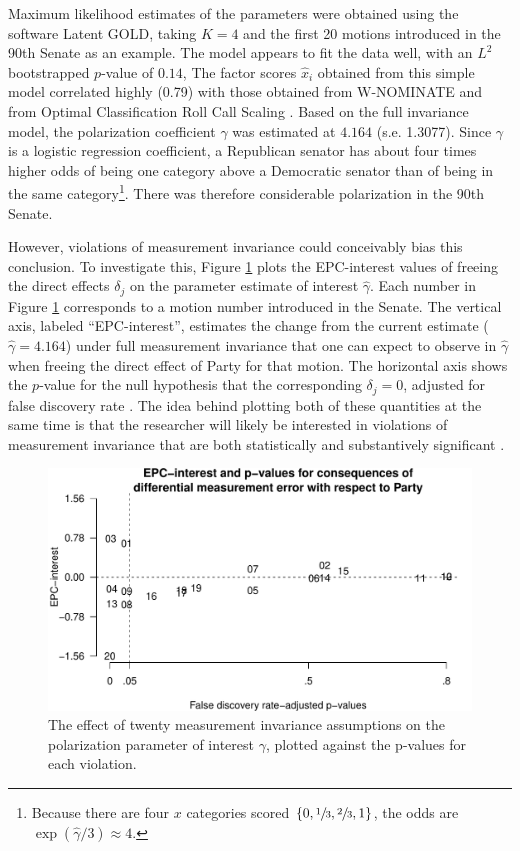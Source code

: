 \documentclass[letterpaper,12pt]{article}
\begin{document}
Maximum likelihood estimates of the parameters were obtained using the software Latent GOLD, taking $K=4$ and the first 20 motions introduced in the 90th Senate as an example. The model appears to fit the data well, with an $L^2$ bootstrapped $p$-value of $0.14$, The factor scores $\hat{x}_i$ obtained from this simple model correlated highly (0.79) with those obtained from W-NOMINATE \citep{poole2008scaling} and from Optimal Classification Roll Call Scaling \citep[0.81;][]{poole2012oc}. Based on the full invariance model, the polarization coefficient $\hat{\gamma}$ was estimated at $4.164$ (s.e. 1.3077). Since $\gamma$ is a logistic regression coefficient,  a Republican senator has about four times higher odds of being one category above a Democratic senator than of being in the same category\footnote{Because there are four $x$ categories scored $\{0, \sfrac{1}{3}, \sfrac{2}{3}, 1\}$, the odds are $\exp(\hat{\gamma}/3)\approx4$.}. There was therefore considerable polarization in the 90th Senate. 

However, violations of measurement invariance could conceivably bias this conclusion. To investigate this, Figure \ref{fig:epc-interest} plots the EPC-interest values of freeing the direct effects $\delta_j$ on the parameter estimate of interest $\hat{\gamma}$. Each number in Figure \ref{fig:epc-interest} corresponds to a motion number introduced in the Senate. The vertical axis, labeled ``EPC-interest'', estimates the change from the current estimate ($\hat{\gamma}=4.164$) under full measurement invariance that one can expect to observe in $\hat{\gamma}$ when freeing the direct effect of Party for that motion. 
The horizontal axis shows the $p$-value for the null hypothesis that the corresponding $\delta_j = 0$, adjusted for false discovery rate \citep{benjamini1995controlling}. The idea behind plotting both of these quantities at the same time is that the researcher will likely be interested in violations of measurement invariance that are both statistically and substantively significant \citep{saris2009testing}.

\begin{figure}\centering
\includegraphics[width=.8\textwidth]{../outputs/EPC-interest.pdf}
\caption{The effect of twenty measurement invariance assumptions on the polarization parameter of interest $\gamma$, plotted against the p-values for each violation.}
\label{fig:epc-interest}
\end{figure}
\end{document}
